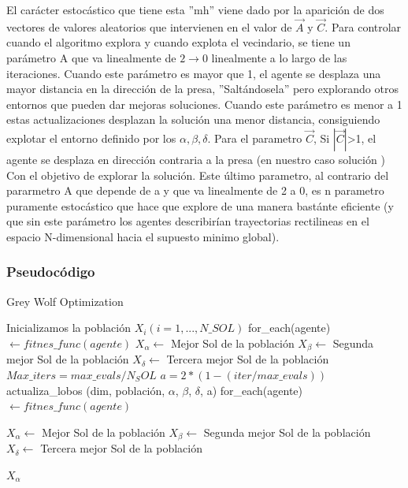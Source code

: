 \documentclass[a4paper, 12.5pt]{report}
\begin{document}
El carácter estocástico que tiene esta ''mh'' viene dado por la aparición de dos vectores de valores aleatorios que intervienen en el valor de $\vec{A}$ y $\vec{C}$. Para controlar cuando el algoritmo explora y cuando explota el vecindario, se tiene un parámetro A que va linealmente de $2 \rightarrow 0$ linealmente a lo largo de las iteraciones. Cuando este parámetro es mayor que 1, el agente se desplaza una mayor distancia en la dirección de la presa, ''Saltándosela'' pero explorando otros entornos que pueden dar mejoras soluciones. Cuando este parámetro es menor a 1 estas actualizaciones desplazan la solución una menor distancia, consiguiendo explotar el entorno definido por los $\alpha,\beta,\delta$. Para el parametro $\vec{C}$, Si $|\vec{C}|$>1, el agente se desplaza en dirección contraria a la presa (en nuestro caso solución ) Con el objetivo de explorar la solución. Este último parametro, al contrario del pararmetro A que depende de a y que va linealmente de 2 a 0, es n parametro puramente estocástico que hace que explore de una manera bastánte eficiente (y que sin este parámetro los agentes describirían trayectorias rectilineas en el espacio N-dimensional hacia el supuesto minimo global).


\subsubsection*{Pseudocódigo}


\begin{algorithm}[H]
    \caption{Grey Wolf Optimization}\label{alg:GWO}
    \begin{algorithmic}[1]
        \State Inicializamos la población $X_i (i=1,...,N\_SOL)$
        \State for\_each(agente) $ \gets fitnes\_func(agente)$
        \State $X_\alpha \gets$ Mejor Sol de la población
        \State $X_\beta \gets$ Segunda mejor Sol de la población
        \State $X_\delta \gets$ Tercera mejor Sol de la población
        \State $Max\_iters=max\_evals/N_SOL$
        \State $a=2*(1-(iter/max\_evals))$
        \State actualiza\_lobos (dim, población, $\alpha$, $\beta$, $\delta$, a)
        \State for\_each(agente) $ \gets fitnes\_func(agente)$

        \State $X_\alpha \gets$ Mejor Sol de la población
        \State $X_\beta \gets$ Segunda mejor Sol de la población
        \State $X_\delta \gets$ Tercera mejor Sol de la población


        \EndFor

        \Return $X_\alpha $
        \EndFunction


    \end{algorithmic}
\end{algorithm}
\end{document}

